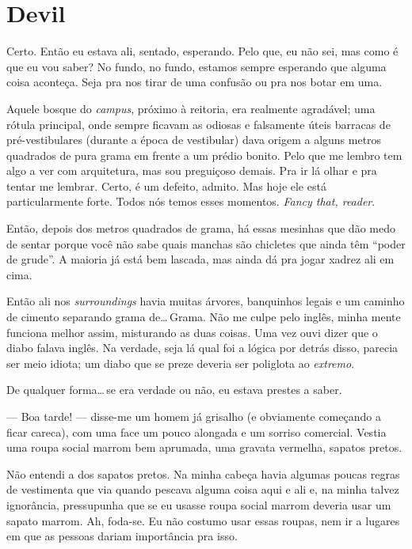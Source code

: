 \chapter{Devil}

Certo. Então eu estava ali, sentado, esperando. Pelo que, eu não sei, mas como é que eu vou saber? No fundo, no fundo, estamos sempre esperando que alguma coisa aconteça. Seja pra nos tirar de uma confusão ou pra nos botar em uma.

Aquele bosque do \emph{campus}, próximo à reitoria, era realmente agradável; uma rótula principal, onde sempre ficavam as odiosas e falsamente úteis barracas de pré-ves\-ti\-bu\-la\-res (durante a época de vestibular) dava origem a alguns metros quadrados de pura grama em frente a um prédio bonito. Pelo que me lembro tem algo a ver com arquitetura, mas sou preguiçoso demais. Pra ir lá olhar e pra tentar me lembrar. Certo, é um defeito, admito. Mas hoje ele está particularmente forte. Todos nós temos esses momentos. \foreignlanguage{english}{\emph{Fancy that, reader}}.

Então, depois dos metros quadrados de grama, há essas mesinhas que dão medo de sentar porque você não sabe quais manchas são chicletes que ainda têm ``poder de grude''. A maioria já está bem lascada, mas ainda dá pra jogar xadrez ali em cima.

\begin{sloppypar}
Então ali nos \emph{surroundings} havia muitas árvores, banquinhos legais e um caminho de cimento separando grama de\ldots\,Grama. Não me culpe pelo inglês, minha mente funciona melhor assim, misturando as duas coisas. Uma vez ouvi dizer que o diabo falava inglês. Na verdade, seja lá qual foi a lógica por detrás disso, parecia ser meio idiota; um diabo que se preze deveria ser poliglota ao \emph{extremo}.
\end{sloppypar}

De qualquer forma\ldots\,se era verdade ou não, eu estava prestes a saber.

--- Boa tarde! --- disse-me um homem já grisalho (e obviamente começando a ficar careca), com uma face um pouco alongada e um sorriso comercial. Vestia uma roupa social marrom bem aprumada, uma gravata vermelha, sapatos pretos.

Não entendi a dos sapatos pretos. Na minha cabeça havia algumas poucas regras de vestimenta que via quando pescava alguma coisa aqui e ali e, na minha talvez ignorância, pressupunha que se eu usasse roupa social marrom deveria usar um sapato marrom. Ah, foda-se. Eu não costumo usar essas roupas, nem ir a lugares em que as pessoas dariam importância pra isso.

